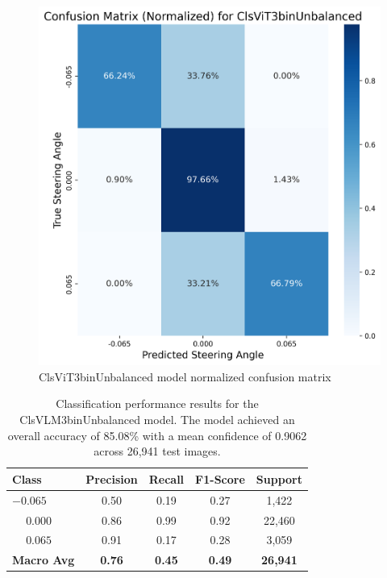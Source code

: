 \begin{figure}[H]
\centering
\includegraphics[width=0.65\linewidth]{Figures/Results/cm_norm_ClsViT3binUnbalanced.png}
\caption{ClsViT3binUnbalanced model normalized confusion matrix}
\label{fig:cm_norm_ClsViT3binUnbalanced}
\end{figure}



\begin{table}[htbp]
\centering
\begin{tabular}{@{}lcccc@{}}
\toprule
\textbf{Class} & \textbf{Precision} & \textbf{Recall} & \textbf{F1-Score} & \textbf{Support} \\
\midrule
$-0.065$ & 0.50 & 0.19 & 0.27 & 1,422 \\
$\phantom{-}0.000$ & 0.86 & 0.99 & 0.92 & 22,460 \\
$\phantom{-}0.065$ & 0.91 & 0.17 & 0.28 & 3,059 \\
\midrule
\textbf{Macro Avg} & \textbf{0.76} & \textbf{0.45} & \textbf{0.49} & \textbf{26,941} \\
\bottomrule
\end{tabular}
\caption{Classification performance results for the ClsVLM3binUnbalanced model. The model achieved an overall accuracy of 85.08\% with a mean confidence of 0.9062 across 26,941 test images.}
\label{tab:clf_report_ClsVLM3binUnbalanced}
\end{table}


